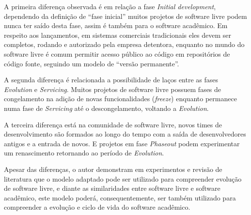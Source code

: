 A primeira diferença observada é em relação a fase {\it Initial development},
dependendo da definição de ``fase inicial'' muitos projetos de software livre
podem nunca ter saído desta fase, assim é também para o software acadêmico. Em respeito aos lançamentos,
em sistemas comerciais tradicionais eles devem ser completos, rodando e autorizado
pela empresa detentora, enquanto no mundo do software livre é comum
permitir acesso público ao código em repositórios de código fonte, seguindo
um modelo de ``versão permanente''.

A segunda diferença é relacionada a possibilidade de laços entre
as fases {\it Evolution} e {\it Servicing}. Muitos projetos de software livre
possuem fases de congelamento na adição de novas funcionalidades ({\it freeze})
enquanto permanece numa fase de {\it Servicing} até o descongelamento, voltando
a {\it Evolution}.

A terceira diferença está na comunidade de software livre,
novos times de desenvolvimento são formados ao longo do tempo
com a saída de desenvolvedores antigos e a entrada de novos.
E projetos em fase {\it Phaseout} podem experimentar um renascimento
retornando ao período de {\it Evolution}.

Apesar das diferenças, o autor  demonstram em experimentos e
revisão de literatura que o modelo adaptado pode ser utilizado para
compreender evolução de software livre, e diante as similaridades entre software livre
e software acadêmico, este modelo poderá, consequentemente, ser também
utilizado para compreender a evolução e ciclo de vida do software acadêmico.
